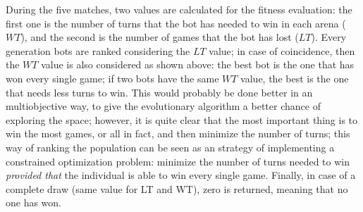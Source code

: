 \documentclass{llncs}
\begin{document}
During the five matches, two values are calculated for the fitness
evaluation: the first one is the number of turns that the bot has
needed to win in each arena ($WT$), and the second is the number of
games that the bot has lost ($LT$). Every generation bots are ranked
considering the $LT$ value; in case of coincidence, then the $WT$
value is also considered as shown above: the best bot is the one that
has won every single game; if two bots have the same $WT$ value, the
best is the one that needs less turns to win.  This would probably be
done better in an multiobjective way, to give the evolutionary
algorithm a better chance of exploring the space; however, it is quite
clear that the most important thing is to win the most games, or all
in fact, and then minimize the number of turns; this way of ranking
the population can be seen as an strategy of implementing a
constrained optimization problem: minimize the number of turns needed
to win {\em provided that} the individual is able to win every single
game. 
Finally, in case of a complete draw (same value for LT and WT), zero is returned, meaning that no one has won.





  

\end{document}
